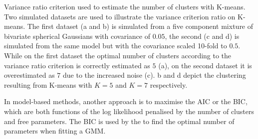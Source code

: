
{Variance ratio criterion used to estimate the number of clusters with K-means.}
{
  Two simulated datasets are used to illustrate the variance criterion ratio on K-means.
  The first dataset (a and b) is simulated from a five component mixture of bivariate spherical Gaussians with covariance of $0.05$,
  the second (c and d) is simulated from the same model but with the covariance scaled 10-fold to $0.5$.
  While on the first dataset the optimal number of clusters according to the variance ratio criterion is correctly estimated as $5$ (a),
  on the second dataset it is overestimated as $7$ due to the increased noise (c).
  b and d depict the clustering resulting from K-means with $K=5$ and $K=7$ respectively.
}


In model-based methods, another approach is to maximise the \gls{AIC} or the \gls{BIC},
which are both functions of the log likelihood penalised by the number of clusters and free parameters.
The \gls{BIC} is used by the  to find the optimal number of parameters when fitting a \gls{GMM}.




